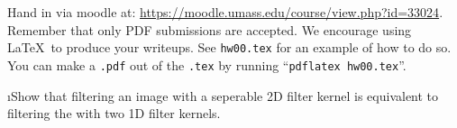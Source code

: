 \documentclass[fleqn]{article}
\begin{document}


Hand in via moodle at: \url{https://moodle.umass.edu/course/view.php?id=33024}.
Remember that only PDF submissions are accepted.  We encourage using
\LaTeX\ to produce your writeups.  See \verb+hw00.tex+ for an example
of how to do so.  You can make a \verb+.pdf+ out of the \verb+.tex+ by
running ``\verb+pdflatex hw00.tex+''.

\bee
\i Show that filtering an image with a seperable 2D filter kernel is equivalent to filtering the with two 1D filter kernels.

\vspace{1in}
\end{document}
